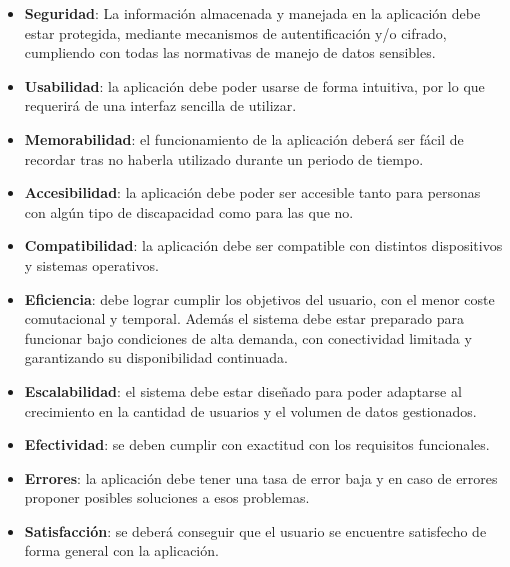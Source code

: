     
    \begin{itemize}
        \item \textbf{Seguridad}: La información almacenada y manejada en la aplicación debe estar protegida, mediante mecanismos de autentificación y/o cifrado, cumpliendo con todas las normativas de manejo de datos sensibles.
        
        \item \textbf{Usabilidad}: la aplicación debe poder usarse de forma intuitiva, por lo que requerirá de una interfaz sencilla de utilizar.
        
        \item \textbf{Memorabilidad}: el funcionamiento de la aplicación deberá ser fácil de recordar tras no haberla utilizado durante un periodo de tiempo.

        \item \textbf{Accesibilidad}: la aplicación debe poder ser accesible tanto para personas con algún tipo de discapacidad como para las que no. 
        
        \item \textbf{Compatibilidad}: la aplicación debe ser compatible con distintos dispositivos y sistemas operativos.
        
        \item \textbf{Eficiencia}: debe lograr cumplir los objetivos del usuario, con el menor coste comutacional y temporal. Además el sistema debe estar preparado para funcionar bajo condiciones de alta demanda, con conectividad limitada y garantizando su disponibilidad continuada.
        
        \item \textbf{Escalabilidad}: el sistema debe estar diseñado para poder adaptarse al crecimiento en la cantidad de usuarios y el volumen de datos gestionados.
        
        \item \textbf{Efectividad}: se deben cumplir con exactitud con los requisitos funcionales.
        
        \item \textbf{Errores}: la aplicación debe tener una tasa de error baja y en caso de errores proponer posibles soluciones a esos problemas.
        
        \item \textbf{Satisfacción}: se deberá conseguir que el usuario se encuentre satisfecho de forma general con la aplicación.
        
    \end{itemize}


